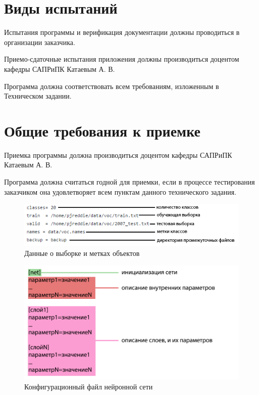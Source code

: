 \documentclass[a4paper,english]{G2-105}
\begin{document}
\section{Виды испытаний} \ttl
\par Испытания программы и верификация документации должны проводиться в организации заказчика.
\par Приемо-сдаточные испытания приложения должны производиться доцентом кафедры САПРиПК Катаевым А. В. 
\par Программа должна соответствовать всем требованиям, изложенным в Техническом задании.
\ttl
\section{Общие требования к приемке} \ttl
\par Приемка программы должна производиться доцентом кафедры
САПРиПК Катаевым А. В.
\par Программа должна считаться годной для приемки, если в процессе
тестирования заказчиком она удовлетворяет всем пунктам данного
технического задания.

\begin{figure} 
\includegraphics[width = \linewidth]{metki.png}
\caption{Данные о выборке и метках объектов}\label{met}
\end{figure}
\begin{figure} 
\includegraphics[width = \linewidth]{network_cfg.png}
\caption{Конфигурационный файл нейронной сети}\label{network_cfg}
\end{figure}
\end{document}
